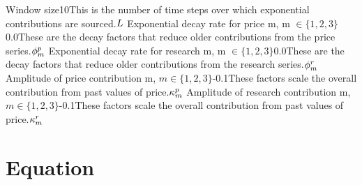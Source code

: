 \documentclass{article}
\begin{document}
\logo
{} %
\tblofcontents


{Window size}{10}{This is the number of time steps over which exponential contributions are sourced.}{$L$}
{Exponential decay rate for price m, \break m $\in \{1,2,3\}$}{0.0}{These are the decay factors that reduce older contributions from the price series.}{$\phi_m^{p}$}
{Exponential decay rate for research	m, \break m $\in \{1,2,3\}$}{0.0}{These are the decay factors that reduce older contributions from the research series.}{$\phi_m^{r}$}
{Amplitude of price contribution m, \break $m \in \{1,2,3\}$}{-0.1}{These factors scale the overall contribution from past values of price.}{$\kappa_m^{p}$}
{Amplitude of research contribution m, \break $m \in \{1,2,3\}$}{-0.1}{These factors scale the overall contribution from past values of price.}{$\kappa_m^{r}$}
\stoptable

\section{Equation}
\end{document}
